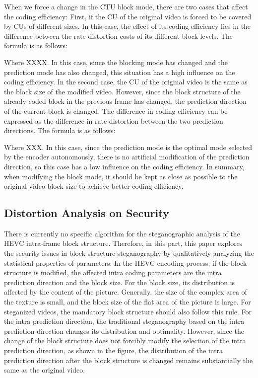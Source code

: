 \documentclass[journal,sort]{IEEEtran}
\begin{document}
When we force a change in the CTU block mode, there are two cases that affect the coding efficiency: First, if the CU of the original video is forced to be covered by CUs of different sizes. In this case, the effect of its coding efficiency lies in the difference between the rate distortion costs of its different block levels. The formula is as follows:

Where XXXX. In this case, since the blocking mode has changed and the prediction mode has also changed, this situation has a high influence on the coding efficiency.
In the second case, the CU of the original video is the same as the block size of the modified video. However, since the block structure of the already coded block in the previous frame has changed, the prediction direction of the current block is changed. The difference in coding efficiency can be expressed as the difference in rate distortion between the two prediction directions. The formula is as follows:

Where XXX. In this case, since the prediction mode is the optimal mode selected by the encoder autonomously, there is no artificial modification of the prediction direction, so this case has a low influence on the coding efficiency. In summary, when modifying the block mode, it should be kept as close as possible to the original video block size to achieve better coding efficiency.
\subsection{Distortion Analysis on Security}
There is currently no specific algorithm for the steganographic analysis of the HEVC intra-frame block structure. Therefore, in this part, this paper explores the security issues in block structure steganography by qualitatively analyzing the statistical properties of parameters.
In the HEVC encoding process, if the block structure is modified, the affected intra coding parameters are the intra prediction direction and the block size. For the block size, its distribution is affected by the content of the picture. Generally, the size of the complex area of the texture is small, and the block size of the flat area of the picture is large. For steganized videos, the mandatory block structure should also follow this rule.
For the intra prediction direction, the traditional steganography based on the intra prediction direction changes its distribution and optimality. However, since the change of the block structure does not forcibly modify the selection of the intra prediction direction, as shown in the figure, the distribution of the intra prediction direction after the block structure is changed remains substantially the same as the original video.
\end{document}
